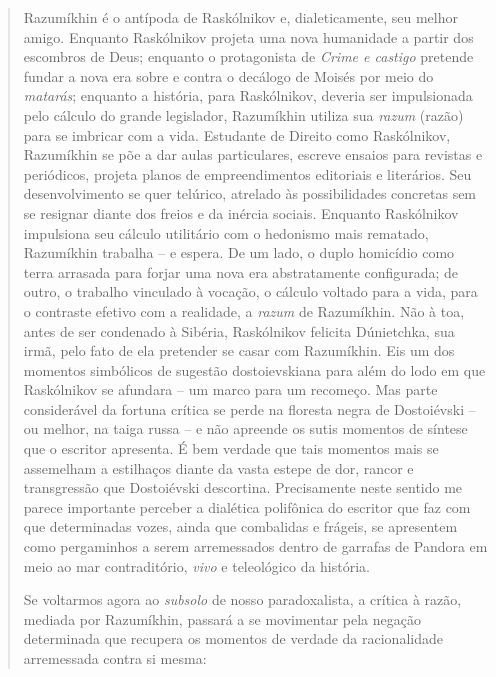 {\begin{quote}
Razumíkhin é o antípoda de Raskólnikov e, dialeticamente, seu melhor
amigo. Enquanto Raskólnikov projeta uma nova humanidade a partir dos
escombros de Deus; enquanto o protagonista de \emph{Crime e castigo}
pretende fundar a nova era sobre e contra o decálogo de Moisés por meio
do \emph{matarás}; enquanto a história, para Raskólnikov, deveria ser
impulsionada pelo cálculo do grande legislador, Razumíkhin utiliza sua
\emph{razum} (razão) para se imbricar com a vida. Estudante de Direito
como Raskólnikov, Razumíkhin se põe a dar aulas particulares, escreve
ensaios para revistas e periódicos, projeta planos de empreendimentos
editoriais e literários. Seu desenvolvimento se quer telúrico, atrelado
às possibilidades concretas sem se resignar diante dos freios e da
inércia sociais. Enquanto Raskólnikov impulsiona seu cálculo utilitário
com o hedonismo mais rematado, Razumíkhin trabalha -- e espera. De um
lado, o duplo homicídio como terra arrasada para forjar uma nova era
abstratamente configurada; de outro, o trabalho vinculado à vocação, o
cálculo voltado para a vida, para o contraste efetivo com a realidade, a
\emph{razum} de Razumíkhin. Não à toa, antes de ser condenado à Sibéria,
Raskólnikov felicita Dúnietchka, sua irmã, pelo fato de ela pretender se
casar com Razumíkhin. Eis um dos momentos simbólicos de sugestão
dostoievskiana para além do lodo em que Raskólnikov se afundara -- um
marco para um recomeço. Mas parte considerável da fortuna crítica se
perde na floresta negra de Dostoiévski -- ou melhor, na taiga russa -- e
não apreende os sutis momentos de síntese que o escritor apresenta. É
bem verdade que tais momentos mais se assemelham a estilhaços diante da
vasta estepe de dor, rancor e transgressão que Dostoiévski descortina.
Precisamente neste sentido me parece importante perceber a dialética
polifônica do escritor que faz com que determinadas vozes, ainda que
combalidas e frágeis, se apresentem como pergaminhos a serem
arremessados dentro de garrafas de Pandora em meio ao mar contraditório,
\emph{vivo} e teleológico da história.

Se voltarmos agora ao \emph{subsolo} de nosso paradoxalista, a crítica à
razão, mediada por Razumíkhin, passará a se movimentar pela negação
determinada que recupera os momentos de verdade da racionalidade
arremessada contra si mesma:


\end{quote}}

